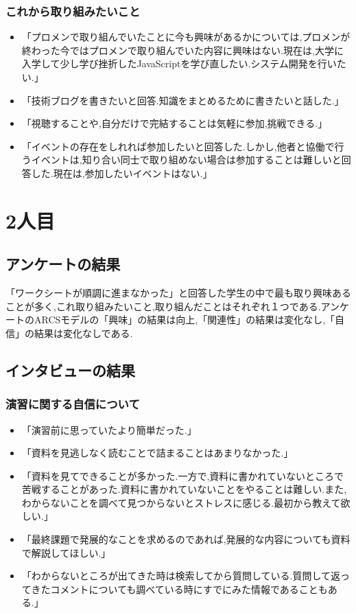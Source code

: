 \documentclass[11pt, a4paper]{jreport}
\begin{document}
\subsubsection{これから取り組みたいこと}

\begin{itemize}
\item 「プロメンで取り組んでいたことに今も興味があるかについては,プロメンが終わった今ではプロメンで取り組んでいた内容に興味はない.現在は,大学に入学して少し学び挫折したJavaScriptを学び直したい.システム開発を行いたい.」
\item 「技術ブログを書きたいと回答.知識をまとめるために書きたいと話した.」
\item 「視聴することや,自分だけで完結することは気軽に参加,挑戦できる.」
\item 「イベントの存在をしれれば参加したいと回答した.しかし,他者と協働で行うイベントは,知り合い同士で取り組めない場合は参加することは難しいと回答した.現在は,参加したいイベントはない.」
\end{itemize}


\section{2人目}

\subsection{アンケートの結果}

「ワークシートが順調に進まなかった」と回答した学生の中で最も取り興味あることが多く,これ取り組みたいこと,取り組んだことはそれぞれ１つである.アンケートのARCSモデルの「興味」の結果は向上,「関連性」の結果は変化なし,「自信」の結果は変化なしである.

\subsection{インタビューの結果}

\subsubsection{演習に関する自信について}

\begin{itemize}
\item 「演習前に思っていたより簡単だった.」
\item 「資料を見逃しなく読むことで詰まることはあまりなかった.」
\item 「資料を見てできることが多かった.一方で,資料に書かれていないところで苦戦することがあった.資料に書かれていないことをやることは難しい.また,わからないことを調べて見つからないとストレスに感じる.最初から教えて欲しい.」
\item 「最終課題で発展的なことを求めるのであれば,発展的な内容についても資料で解説してほしい.」
\item 「わからないところが出てきた時は検索してから質問している.質問して返ってきたコメントについても調べている時にすでにみた情報であることもある.」
\end{itemize}
\end{document}
